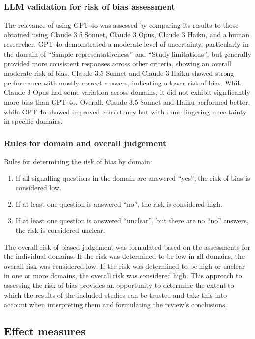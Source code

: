 \documentclass[a4paper,fleqn]{cas-sc}
\begin{document}
\subsubsection{LLM validation for risk of bias assessment}

The relevance of using GPT-4o was assessed by comparing its results to those obtained using Claude 3.5 Sonnet, Claude 3 Opus, Claude 3 Haiku, and a human researcher. GPT-4o demonstrated a moderate level of uncertainty, particularly in the domain of ``Sample representativeness'' and ``Study limitations'', but generally provided more consistent responses across other criteria, showing an overall moderate risk of bias. Claude 3.5 Sonnet and Claude 3 Haiku showed strong performance with mostly correct answers, indicating a lower risk of bias. While Claude 3 Opus had some variation across domains, it did not exhibit significantly more bias than GPT-4o. Overall, Claude 3.5 Sonnet and Haiku performed better, while GPT-4o showed improved consistency but with some lingering uncertainty in specific domains.

\subsubsection{Rules for domain and overall judgement}
Rules for determining the risk of bias by domain:
\begin{enumerate}[noitemsep]
\item 
If all signalling questions in the domain are answered ``yes'', the risk of bias is considered low.
\item
If at least one question is answered ``no'', the risk is considered high. 
\item
If at least one question is answered ``unclear'', but there are no ``no'' answers, the risk is considered unclear.
\end{enumerate}

The overall risk of biased judgement was formulated based on the assessments for the individual domains. If the risk was determined to be low in all domains, the overall risk was considered low. If the risk was determined to be high or unclear in one or more domains, the overall risk was considered high. This approach to assessing the risk of bias provides an opportunity to determine the extent to which the results of the included studies can be trusted and take this into account when interpreting them and formulating the review's conclusions.

\subsection{Effect measures}
\end{document}
